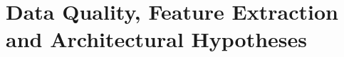\section{Data Quality, Feature Extraction and Architectural Hypotheses}
\label{sec:data-analysis}





